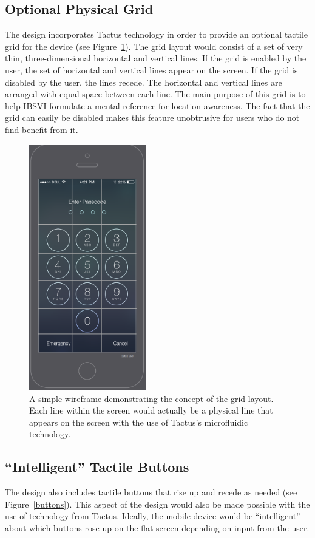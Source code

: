 \documentclass[11pt]{article}
\begin{document}
\subsection{Optional Physical Grid}
The design incorporates Tactus technology in order to provide an optional tactile grid for the device (see Figure~\ref{wireframe-grid}). The grid layout would consist of a set of very thin, three-dimensional horizontal and vertical lines. If the grid is enabled by the user, the set of horizontal and vertical lines appear on the screen. If the grid is disabled by the user, the lines recede. The horizontal and vertical lines are arranged with equal space between each line. The main purpose of this grid is to help IBSVI formulate a mental reference for location awareness. The fact that the grid can easily be disabled makes this feature unobtrusive for users who do not find benefit from it.


\begin{figure}[ht]
\centering
\includegraphics[width=2in]{wireframe-grid.png} 
\caption{A simple wireframe demonstrating the concept of the grid layout. Each line within the screen would actually be a physical line that appears on the screen with the use of Tactus's microfluidic technology.}
\label{wireframe-grid}
\end{figure}

\subsection{``Intelligent'' Tactile Buttons}
The design also includes tactile buttons that rise up and recede as needed (see Figure~\ref{buttons}). This aspect of the design would also be made possible with the use of technology from Tactus. Ideally, the mobile device would be ``intelligent'' about which buttons rose up on the flat screen depending on input from the user.
 
\end{document}
